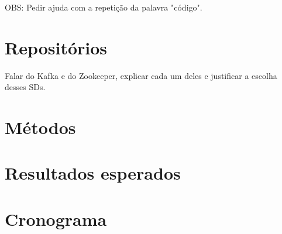 OBS: Pedir ajuda com a repetição da palavra "código".

\section{Repositórios}\label{sec:repositorios}
Falar do Kafka e do Zookeeper, explicar cada um deles e justificar a escolha desses SDs.

\section{Métodos}\label{sec:metodo}

\section{Resultados esperados}


\section{Cronograma}